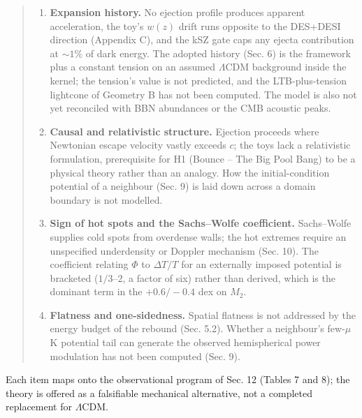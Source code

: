 \documentclass[
  11pt,
]{article}
\begin{document}
\begin{quote}
\begin{enumerate}
  patches per dimension in the comoving Hubble volume at the bounce for
  Planck-scale conversion; homogeneity across those patches is assumed.
  Planck-relic dark matter must also face femtolensing, capture, and
  abundance constraints, and the relativistic formulation of the
  ejection remains open.
\item
  \textbf{Expansion history.} No ejection profile produces apparent
  acceleration, the toy's \(w(z)\) drift runs opposite to the DES+DESI
  direction (Appendix C), and the kSZ gate caps any ejecta contribution
  at \(\sim\!1\%\) of dark energy. The adopted history (Sec. 6) is the
  framework plus a constant tension on an assumed \(\Lambda\)CDM
  background inside the kernel; the tension's value is not predicted,
  and the LTB-plus-tension lightcone of Geometry B has not been
  computed. The model is also not yet reconciled with BBN abundances or
  the CMB acoustic peaks.
\item
  \textbf{Causal and relativistic structure.} Ejection proceeds where
  Newtonian escape velocity vastly exceeds \(c\); the toys lack a
  relativistic formulation, prerequisite for H1 (Bounce -- The Big Pool
  Bang) to be a physical theory rather than an analogy. How the
  initial-condition potential of a neighbour (Sec. 9) is laid down
  across a domain boundary is not modelled.
\item
  \textbf{Sign of hot spots and the Sachs--Wolfe coefficient.}
  Sachs--Wolfe supplies cold spots from overdense walls; the hot
  extremes require an unspecified underdensity or Doppler mechanism
  (Sec. 10). The coefficient relating \(\Phi\) to \(\Delta T/T\) for an
  externally imposed potential is bracketed (\(1/3\)--\(2\), a factor of
  six) rather than derived, which is the dominant term in the
  \(+0.6/-0.4\) dex on \(M_2\).
\item
  \textbf{Flatness and one-sidedness.} Spatial flatness is not addressed
  by the energy budget of the rebound (Sec. 5.2). Whether a neighbour's
  few-\(\mu\)K potential tail can generate the observed hemispherical
  power modulation has not been computed (Sec. 9).
\end{enumerate}
\end{quote}

Each item maps onto the observational program of Sec. 12 (Tables 7 and
8); the theory is offered as a falsifiable mechanical alternative, not a
completed replacement for \(\Lambda\)CDM.
\end{document}
